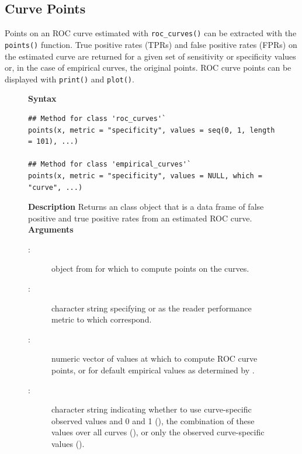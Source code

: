 \documentclass[
]{jss}
\newenvironment{Description}{\textbf{Description}\vspace{0.5em}\newline}{\vspace{0.5em}\newline}
\begin{document}
\begin{CodeChunk}
\end{CodeChunk}

\hypertarget{curve-points}{%
\subsection{Curve Points}\label{curve-points}}

Points on an ROC curve estimated with \texttt{roc\_curves()} can be
extracted with the \texttt{points()} function. True positive rates
(TPRs) and false positive rates (FPRs) on the estimated curve are
returned for a given set of sensitivity or specificity values or, in the
case of empirical curves, the original points. ROC curve points can be
displayed with \texttt{print()} and \texttt{plot()}.

\begin{figure}[h]
\begin{tcolorbox}[title=ROC Points Function]
\textbf{Syntax}
\begin{verbatim}
## Method for class 'roc_curves'`  
points(x, metric = "specificity", values = seq(0, 1, length = 101), ...)

## Method for class 'empirical_curves'`  
points(x, metric = "specificity", values = NULL, which = "curve", ...)
\end{verbatim}
\begin{Description}
Returns an  class object that is a data frame of false positive and true positive rates from an estimated ROC curve.
\end{Description}
\textbf{Arguments}
\begin{description}
\item[:] object from  for which to compute points on the curves.
\item[:] character string specifying  or  as the reader performance metric to which  correspond.
\item[:] numeric vector of values at which to compute ROC curve points, or  for default empirical values as determined by .
\item[:] character string indicating whether to use curve-specific observed values and 0 and 1 (), the combination of these values over all curves (), or only the observed curve-specific values ().
\end{description}
\end{tcolorbox}
\end{figure}
\end{document}
